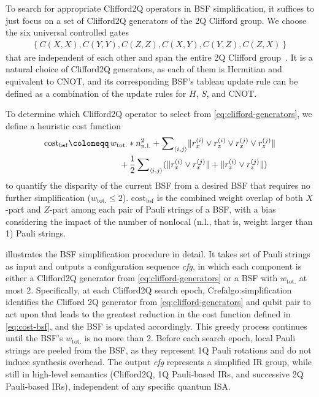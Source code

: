 \documentclass[conference,9pt]{IEEEtran}
\newcommand{\CNOT}{\mathrm{CNOT}}
\newcommand{\totalWeight}{w_\mathrm{tot.}}
\begin{document}
    To search for appropriate Clifford2Q operators in BSF simplification, it suffices to just focus on a set of Clifford2Q generators of the 2Q Clifford group. We choose the six universal controlled gates
    \begin{align}
        \left\{ C(X,X), C(Y,Y), C(Z,Z), C(X,Y), C(Y,Z), C(Z,X) \right\}\label{eq:clifford-generators}
    \end{align}
    that are independent of each other and span the entire 2Q Clifford group~\cite{grier2022classification}. It is a natural choice of Clifford2Q generators, as each of them is Hermitian and equivalent to $ \CNOT $, and its corresponding BSF's tableau update rule can be defined as a combination of the update rules for $ H $, $ S $, and $ \CNOT $. 

    To determine which Clifford2Q operator to select from \eqref{eq:clifford-generators}, we define a heuristic cost function%
    \begin{align}
        \mathrm{cost}_{\mathrm{bsf}} \coloneqq \, & \totalWeight * n_{\mathrm{n.l.}}^2 \notag + \sum\nolimits_{\langle i,j \rangle} \lVert r_x^{(i)} \lor r_z^{(i)} \lor r_x^{(j)} \lor r_z^{(j)} \rVert  \notag\\
        & \quad + \frac{1}{2} \sum\nolimits_{\langle i,j \rangle} (\lVert r_x^{(i)} \lor r_x^{(j)} \rVert + \lVert r_z^{(i)} \lor r_z^{(j)} \rVert) \label{eq:cost-bsf} 
    \end{align}
    to quantify the disparity of the current BSF from a desired BSF that requires no further simplification ($ \totalWeight \leq 2 $). $ \mathrm{cost}_{\mathrm{bsf}} $ is the combined weight overlap of both $ X $-part and $ Z $-part among each pair of Pauli strings of a BSF, with a bias considering the impact of the number of nonlocal (n.l., that is, weight larger than 1) Pauli strings. %
    
     illustrates the BSF simplification procedure in detail. It takes set of Pauli strings as input and outputs a configuration sequence \textit{cfg}, in which each component is either a Clifford2Q generator from \eqref{eq:clifford-generators} or a BSF with $\totalWeight$ at most 2. Specifically, at each Clifford2Q search epoch, Cref{algo:simplification} identifies the Clifford 2Q generator from \eqref{eq:clifford-generators} and qubit pair to act upon that leads to the greatest reduction in the cost function defined in \eqref{eq:cost-bsf}, and the BSF is updated accordingly. This greedy process continues until the BSF's $ \totalWeight $ is no more than 2. Before each search epoch, local Pauli strings are peeled from the BSF, as they represent 1Q Pauli rotations and do not induce synthesis overhead. The output \textit{cfg} represents a simplified IR group, while still in high-level semantics (Clifford2Q, 1Q Pauli-based IRs, and successive 2Q Pauli-based IRs), independent of any specific quantum ISA.
\end{document}
